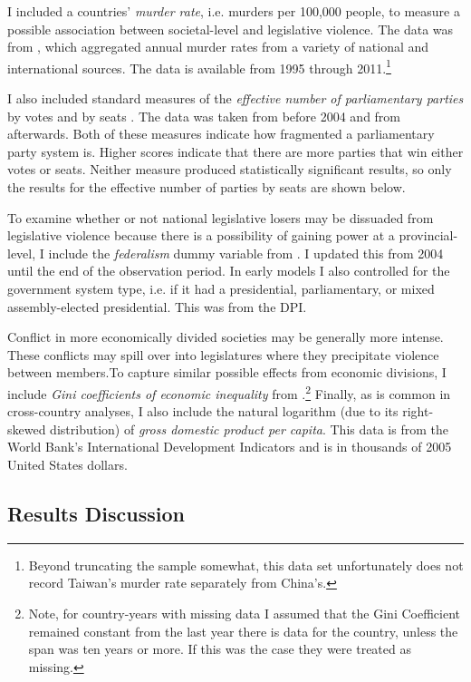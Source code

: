 \documentclass[a4paper]{article}\usepackage[]{graphicx}\usepackage[]{color}
\begin{document}
I included a countries' \emph{murder rate}, i.e. murders per 100,000 people, to measure a possible association between societal-level and legislative violence. The data was from \cite{UNMurder2013}, which aggregated annual murder rates from a variety of national and international sources. The data is available from 1995 through 2011.\footnote{Beyond truncating the sample somewhat, this data set unfortunately does not record Taiwan's murder rate separately from China's.}

I also included standard measures of the \emph{effective number of parliamentary parties} by votes and by seats \citep[]{Laakso1979, Taagepera1989}. The data was taken from \cite{Carey2011} before 2004 and from \cite{Gallagher2012} afterwards. Both of these measures indicate how fragmented a parliamentary party system is. Higher scores indicate that there are more parties that win either votes or seats. Neither measure produced statistically significant results, so only the results for the effective number of parties by seats are shown below.

To examine whether or not national legislative losers may be dissuaded from legislative violence because there is a possibility of gaining power at a provincial-level, I include the \emph{federalism} dummy variable from \cite{Carey2011}. I updated this from 2004 until the end of the observation period. In early models I also controlled for the government system type, i.e. if it had a presidential, parliamentary, or mixed assembly-elected presidential. This was from the DPI.

Conflict in more economically divided societies may be generally more intense. These conflicts may spill over into legislatures where they precipitate violence between members.To capture similar possible effects from economic divisions, I include {\emph{Gini coefficients of economic inequality}} from \cite{UNU2008}.\footnote{Note, for country-years with missing data I assumed that the Gini Coefficient remained constant from the last year there is data for the country, unless the span was ten years or more. If this was the case they were treated as missing.} Finally, as is common in cross-country analyses, I also include the natural logarithm (due to its right-skewed distribution) of {\emph{gross domestic product per capita}}. This data is from the World Bank's International Development Indicators \citeyearpar{WorldBank2011} and is in thousands of 2005 United States dollars.

\subsection*{Results Discussion}
\end{document}
